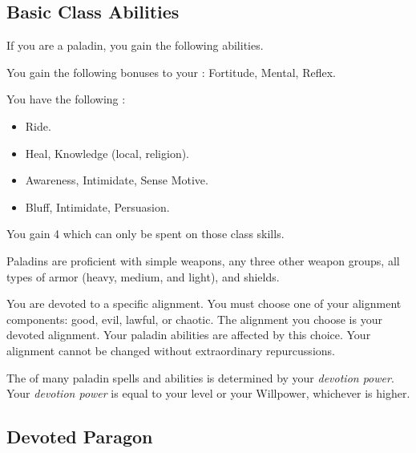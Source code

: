     \subsection{Basic Class Abilities}
        If you are a paladin, you gain the following abilities.

        You gain the following bonuses to your :  Fortitude,  Mental,  Reflex.

        You have the following :
        \begin{itemize}
            \item {} Ride.
            \item {} Heal, Knowledge (local, religion).
            \item {} Awareness, Intimidate, Sense Motive.
            \item {} Bluff, Intimidate, Persuasion.
        \end{itemize}
        You gain 4  which can only be spent on those class skills.

        Paladins are proficient with simple weapons, any three other weapon groups, all types of armor (heavy, medium, and light), and shields.

        You are devoted to a specific alignment.
        You must choose one of your alignment components: good, evil, lawful, or chaotic.
        The alignment you choose is your devoted alignment.
        Your paladin abilities are affected by this choice.
        Your alignment cannot be changed without extraordinary repurcussions.

        The  of many paladin spells and abilities is determined by your \textit{devotion power}.
        Your \textit{devotion power} is equal to your level or your Willpower, whichever is higher.

    \subsection{Devoted Paragon}

